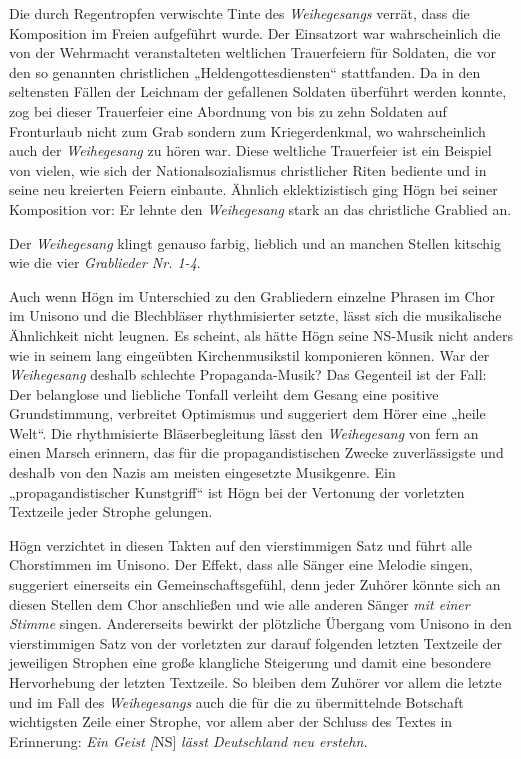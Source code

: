 \documentclass{book}
\newcommand{\zitat}[1]{\textit{#1}}
\begin{document}
Die durch Regentropfen verwischte Tinte des \textit{Weihegesangs}
verrät, dass die Komposition im Freien aufgeführt wurde. Der Einsatzort
war wahrscheinlich die von der Wehrmacht veranstalteten weltlichen
Trauerfeiern für Soldaten, die vor den so genannten christlichen
„Heldengottesdiensten“ stattfanden. Da in den seltensten Fällen der
Leichnam der gefallenen Soldaten überführt werden konnte, zog bei
dieser Trauerfeier eine Abordnung von bis zu zehn Soldaten auf
Fronturlaub nicht zum Grab sondern zum Kriegerdenkmal, wo
wahr\-scheinlich auch der \textit{Weihegesang} zu hören war. Diese
weltliche Trauerfeier ist ein Beispiel von vielen, wie sich der
Nationalsozialismus christlicher Riten be\-diente und in seine neu
kreierten Feiern einbaute. Ähnlich eklektizistisch ging Högn bei seiner
Komposition vor: Er lehnte den \textit{Weihegesang} stark an das
christliche Grablied an.

Der \textit{Weihegesang} klingt genauso farbig, lieblich und an manchen
Stellen kitschig wie die vier \textit{Grablieder Nr. 1-4}.

Auch wenn Högn im Unterschied zu den Grabliedern einzelne Phrasen im
Chor im Unisono und die Blechbläser rhythmisierter setzte, lässt sich
die musikalische Ähnlichkeit nicht leugnen. Es scheint, als hätte Högn
seine NS-Musik nicht anders wie in seinem lang eingeübten
Kirchenmusikstil kompo\-nieren können. War der \textit{Weihegesang}
deshalb schlechte Propaganda-Musik? Das Gegenteil ist der Fall: Der
belanglose und liebliche Tonfall verleiht dem Gesang eine positive
Grundstimmung, verbreitet Optimismus und suggeriert dem Hörer eine
„heile Welt“. Die rhythmisierte Bläserbegleitung lässt den
\textit{Weihegesang} von fern an einen Marsch erinnern, das für die
propagandistischen Zwecke zuverlässigste und deshalb von den Nazis am
meisten eingesetzte Musikgenre. Ein „propagandistischer Kunstgriff“ ist
Högn bei der Vertonung der vorletzten Textzeile jeder Strophe gelungen.


Högn verzichtet in diesen Takten auf den vierstimmigen Satz und führt
alle Chorstimmen im Unisono. Der Effekt, dass alle Sänger eine Melodie
sin\-gen, suggeriert einerseits ein Gemeinschaftsgefühl, denn jeder
Zuhörer könnte sich an diesen Stellen dem Chor anschließen und wie alle
anderen Sänger \textit{mit einer Stimme} singen. Andererseits bewirkt
der plötzliche Übergang vom Uni\-sono in den vierstimmigen Satz von der
vorletzten zur darauf folgenden letz\-ten Textzeile der jeweiligen
Strophen eine große klangliche Steigerung und damit eine besondere
Hervorhebung der letzten Textzeile. So bleiben dem Zuhörer vor allem
die letzte und im Fall des \textit{Weihegesangs} auch die für die zu
übermittelnde Botschaft wichtigsten Zeile einer Strophe, vor allem aber
der Schluss des Textes in Erinnerung: \zitat{Ein Geist
\textup{[}}NS]\zitat{ lässt Deutschland neu erstehn.}
\end{document}
